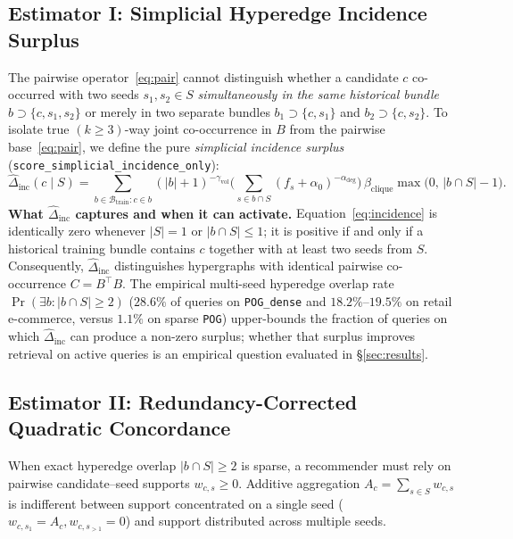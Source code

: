 \subsection{Estimator I: Simplicial Hyperedge Incidence Surplus}
\label{sec:incidence}
The pairwise operator~\eqref{eq:pair} cannot distinguish whether a candidate $c$ co-occurred with two seeds
$s_1, s_2 \in S$ \emph{simultaneously in the same historical bundle} $b \supset \{c, s_1, s_2\}$ or merely in two
separate bundles $b_1 \supset \{c, s_1\}$ and $b_2 \supset \{c, s_2\}$. To isolate true $(k \ge 3)$-way joint
co-occurrence in $B$ from the pairwise base~\eqref{eq:pair}, we define the pure \emph{simplicial incidence
surplus} (\texttt{score\_simplicial\_incidence\_only}):
\begin{equation}
  \hat{\Delta}_{\text{inc}}(c\mid S)
  = \sum_{b \in \mathcal{B}_{\text{train}} : c \in b}
    (|b|+1)^{-\gamma_{\text{vol}}}
    \Big(\sum_{s\in b\cap S}(f_s+\alpha_0)^{-\alpha_{\text{deg}}}\Big)\,
    \beta_{\text{clique}}\max\!\big(0,\,|b\cap S|-1\big).
  \label{eq:incidence}
\end{equation}
\textbf{What $\hat{\Delta}_{\text{inc}}$ captures and when it can activate.}
Equation~\eqref{eq:incidence} is identically zero whenever $|S|=1$ or $|b \cap S| \le 1$; it is positive if and
only if a historical training bundle contains $c$ together with at least two seeds from $S$. Consequently,
$\hat{\Delta}_{\text{inc}}$ distinguishes hypergraphs with identical pairwise co-occurrence $C = B^{\!\top}B$.
The empirical multi-seed hyperedge overlap rate $\Pr(\exists b : |b\cap S|\ge 2)$ ($28.6\%$ of queries on
\texttt{POG\_dense} and $18.2\%$--$19.5\%$ on retail e-commerce, versus $1.1\%$ on sparse \texttt{POG}) upper-bounds
the fraction of queries on which $\hat{\Delta}_{\text{inc}}$ can produce a non-zero surplus; whether that
surplus improves retrieval on active queries is an empirical question evaluated in \S\ref{sec:results}.

\subsection{Estimator II: Redundancy-Corrected Quadratic Concordance}
\label{sec:concordance}
When exact hyperedge overlap $|b \cap S| \ge 2$ is sparse, a recommender must rely on pairwise candidate--seed
supports $w_{c,s} \ge 0$. Additive aggregation $A_c = \sum_{s\in S} w_{c,s}$ is indifferent between support
concentrated on a single seed ($w_{c,s_1}=A_c, w_{c,s_{>1}}=0$) and support distributed across multiple seeds.

